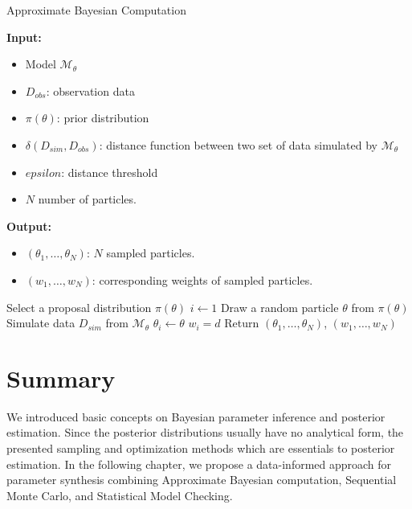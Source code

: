 \begin{algorithm}[H]
    \caption{Approximate Bayesian Computation}
    \label{alg:abc-reject}
    \footnotesize{
        \hspace*{\algorithmicindent} \textbf{Input:}
        \begin{itemize}[noitemsep,topsep=0pt]
            \item Model $\mathcal{M}_\theta$
            \item $D_{obs}$: observation data
            \item $\pi(\theta)$: prior distribution
            \item $\delta(D_{sim}, D_{obs})$: distance function between two set of data simulated by $\mathcal{M}_\theta$
            \item $epsilon$: distance threshold
            \item $N$ number of particles.
        \end{itemize}
        \hspace*{\algorithmicindent} \textbf{Output:}
        \begin{itemize}[noitemsep,topsep=0pt]
            \item $(\theta_1,\ldots,\theta_N)$: $N$ sampled particles.
            \item $(w_1,\ldots,w_N)$: corresponding weights of sampled particles.
        \end{itemize}
    }
    \begin{algorithmic}[1]
        \State Select a proposal distribution $\pi(\theta)$
        \State $i \leftarrow 1$
        \State Draw a random particle $\theta$ from $\pi(\theta)$
        \State Simulate data $D_{sim}$ from $\mathcal{M}_\theta$
        \State $\theta_i \leftarrow \theta$
        \State $w_i = d$
        \EndIf
        \EndWhile
        \State Return $(\theta_1,\ldots,\theta_N)$, $(w_1,\ldots,w_N)$
        \EndProcedure
    \end{algorithmic}
\end{algorithm}


\section{Summary}
We introduced basic concepts on Bayesian parameter inference and posterior estimation. Since the
posterior distributions usually have no analytical form, the presented sampling and
optimization methods which are essentials to posterior estimation. In the following chapter, we
propose a data-informed approach for parameter synthesis combining Approximate Bayesian computation,
Sequential Monte Carlo, and Statistical Model Checking.
